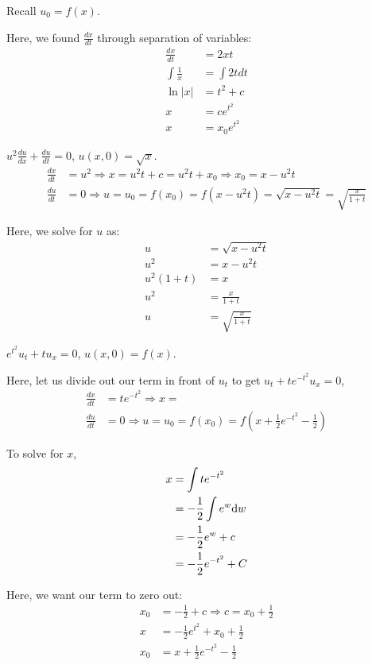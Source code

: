   Recall $u_0 = f(x)$.

  Here, we found $\frac{dx}{dt}$ through separation of variables:
  \begin{align}
    \frac{dx}{dt} & = 2xt\\
    \int \frac{1}{x} & = \int 2t dt\\
    \ln |x| & = t^2 + c\\
    x & = ce^{t^2}\\
    x & = x_0 e^{t^2}
  \end{align}

  \ex $u^2 \frac{du}{dx} + \frac{du}{dt} = 0$, $u(x, 0) = \sqrt x$.
  \begin{align}
    \frac{dx}{dt} & = u^2 \Rightarrow x = u^2 t + c = u^2 t + x_0
    \Rightarrow x_0 = x - u^2 t\\
    \frac{du}{dt} & = 0 \Rightarrow u = u_0 = f(x_0) = f(x - u^2 t)
    = \sqrt{x - u^2 t} = \sqrt{\frac{x}{1 + t}}
  \end{align}

  Here, we solve for $u$ as:
  \begin{align}
    u & = \sqrt{x - u^2 t}\\
    u^2 & = x - u^2 t\\
    u^2(1 + t) & = x\\
    u^2 & = \frac{x}{1 + t}\\
    u & = \sqrt{\frac{x}{1 + t}}
  \end{align}

  \ex $e^{t^2} u_t + tu_x = 0$, $u(x, 0) = f(x)$.

  Here, let us divide out our term in front of
  $u_t$ to get $u_t + te^{-t^2}u_x = 0$,
  \begin{align}
    \frac{dx}{dt} & = te^{-t^2} \Rightarrow x = \\
    \frac{du}{dt} & = 0 \Rightarrow u = u_0 = f(x_0)
    = f(x + \frac{1}{2}e^{-t^2} - \frac{1}{2})
  \end{align}

  To solve for $x$,
  \begin{align}
    x & = \int te^{-t^2}\\
    & = -\frac{1}{2} \int e^w \text dw\\
    & = -\frac{1}{2} e^w + c\\
    & = -\frac{1}{2} e^{-t^2} + C
  \end{align}

  Here, we want our term to zero out:
  \begin{align}
    x_0 & = - \frac{1}{2} + c \Rightarrow c = x_0 + \frac{1}{2}\\
    x & = -\frac{1}{2} e^{t^2} + x_0 + \frac{1}{2}\\
    x_0 & = x + \frac{1}{2} e^{-t^2} - \frac{1}{2}
  \end{align}

